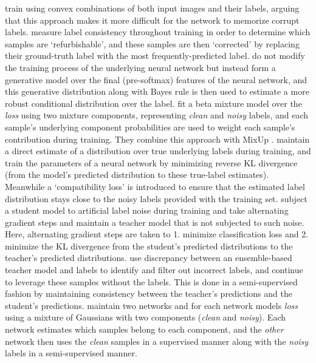 \documentclass{article}
\renewcommand{\b}[1]{\textbf{#1}}
\begin{document}
\b{\cite{zhang2018mixup}} train using convex combinations of both input images and their labels, arguing that this approach makes it more difficult for the network to memorize corrupt labels.
\b{\cite{song2019}} measure label consistency throughout training in order to determine which samples are `refurbishable', and these samples are then `corrected' by replacing their ground-truth label with the most frequently-predicted label.
\b{\cite{lee2019}} do not modify the training process of the underlying neural network but instead form a generative model over the final (pre-softmax) features of the neural network, and this generative distribution along with Bayes rule is then used to estimate a more robust conditional distribution over the label.
\b{\cite{arazo2019}} fit a beta mixture model over the \emph{loss} using two mixture components, representing \emph{clean} and \emph{noisy} labels, and each sample's underlying component probabilities are used to weight each sample's contribution during training. They combine this approach with MixUp \cite{zhang2018mixup}.
\b{\cite{yi2019}} maintain a direct estimate of a distribution over true underlying labels during training, and train the parameters of a neural network by minimizing reverse KL divergence (from the model's predicted distribution to these true-label estimates). Meanwhile a `compatibility loss' is introduced to ensure that the estimated label distribution stays close to the noisy labels provided with the training set.
\b{\cite{li2019}} subject a student model to artificial label noise during training and take alternating gradient steps and maintain a teacher model that is not subjected to such noise. Here, alternating gradient steps are taken to 1. minimize classification loss and 2. minimize the KL divergence from the student's predicted distributions to the teacher's predicted distributions.
\b{\cite{nguyen2020}} use discrepancy between an ensemble-based teacher model and labels to identify and filter out incorrect labels, and continue to leverage these samples without the labels. This is done in a semi-supervised fashion by maintaining consistency between the teacher's predictions and the student's predictions.
\b{\cite{li2020}} maintain two networks and for each network models \emph{loss} using a mixture of Gaussians with two components (\emph{clean} and \emph{noisy}). Each network estimates which samples belong to each component, and the \emph{other} network then uses the \emph{clean} samples in a supervised manner along with the \emph{noisy} labels in a semi-supervised manner.
\end{document}
